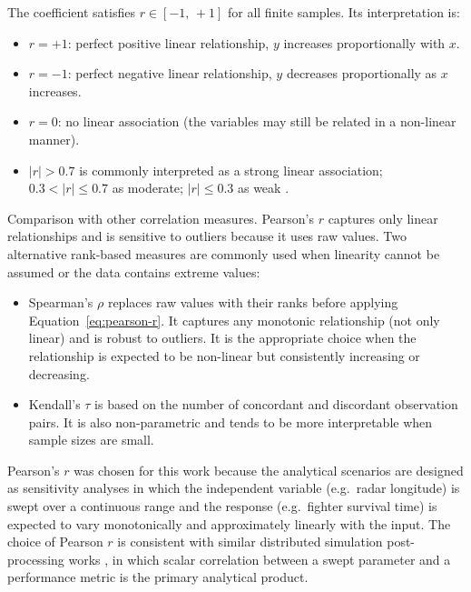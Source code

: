 The coefficient satisfies $r \in [-1,\, +1]$ for all finite samples.  Its interpretation is:

\begin{itemize}
    \item $r = +1$: perfect positive linear relationship, $y$ increases proportionally
          with $x$.
    \item $r = -1$: perfect negative linear relationship, $y$ decreases proportionally
          as $x$ increases.
    \item $r = 0$: no linear association (the variables may still be related in a non-linear
          manner).
    \item $|r| > 0.7$ is commonly interpreted as a strong linear association;
          $0.3 < |r| \leq 0.7$ as moderate; $|r| \leq 0.3$ as weak
          \parencite{montgomery2014statistics}.
\end{itemize}

Comparison with other correlation measures.
Pearson's $r$ captures only linear relationships and is sensitive to outliers because
it uses raw values.  Two alternative rank-based measures are commonly used when linearity
cannot be assumed or the data contains extreme values:

\begin{itemize}
    \item Spearman's $\rho$ replaces raw values with their ranks before applying
          Equation~\eqref{eq:pearson-r}.  It captures any monotonic relationship
          (not only linear) and is robust to outliers.  It is the appropriate choice when
          the relationship is expected to be non-linear but consistently increasing or decreasing.

    \item Kendall's $\tau$ is based on the number of concordant and
          discordant observation pairs.  It is also non-parametric and tends to be
          more interpretable when sample sizes are small.
\end{itemize}

Pearson's $r$ was chosen for this work because the analytical scenarios are designed as
sensitivity analyses in which the independent variable (e.g.\ radar longitude) is swept
over a continuous range and the response (e.g.\ fighter survival time) is expected to vary
monotonically and approximately linearly with the input.  The choice of Pearson $r$ is
consistent with similar distributed simulation post-processing works
\parencite{li2018postprocessing,lagares2022aquila}, in which scalar correlation between
a swept parameter and a performance metric is the primary analytical product.

